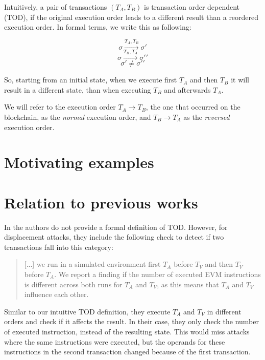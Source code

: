\documentclass[draft,final]{vutinfth} %
\begin{document}
Intuitively, a pair of transactions $(T_A, T_B)$ is transaction order dependent (TOD), if the original execution order leads to a different result than a reordered execution order. In formal terms, we write this as following:

$$\sigma \xrightarrow{T_A, T_B} \sigma \prime$$
$$\sigma \xrightarrow{T_B, T_A} \sigma \prime \prime$$
$$\sigma \prime \neq \sigma \prime \prime$$

So, starting from an initial state, when we execute first $T_A$ and then $T_B$ it will result in a different state, than when executing $T_B$ and afterwards $T_A$.

We will refer to the execution order $T_A \rightarrow T_B$, the one that occurred on the blockchain, as the \emph{normal} execution order, and $T_B \rightarrow T_A$ as the \emph{reversed} execution order.

\section{Motivating examples}


\section{Relation to previous works}

In \cite{torres_frontrunner_2021} the authors do not provide a formal definition of TOD. However, for displacement attacks, they include the following check to detect if two transactions fall into this category:

\begin{quote}
    [...] we run in a simulated environment first $T_A$ before $T_V$ and then $T_V$ before $T_A$. We report a finding if the number of executed EVM instructions is different across both runs for $T_A$ and $T_V$, as this means that $T_A$ and $T_V$ influence each other.
\end{quote}

Similar to our intuitive TOD definition, they execute $T_A$ and $T_V$ in different orders and check if it affects the result. In their case, they only check the number of executed instruction, instead of the resulting state. This would miss attacks where the same instructions were executed, but the operands for these instructions in the second transaction changed because of the first transaction.
\end{document}
